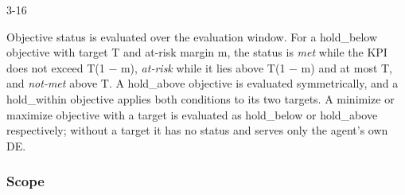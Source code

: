 \begin{wptable}{3-16}
\end{wptable}

Objective status is evaluated over the evaluation window. For a
hold\_\allowbreak{}below objective with target T and at-risk margin m,
the status is \emph{met} while the KPI does not exceed T(1 − m),
\emph{at-risk} while it lies above T(1 − m) and at most T, and
\emph{not-met} above T. A hold\_\allowbreak{}above objective is
evaluated symmetrically, and a hold\_\allowbreak{}within objective
applies both conditions to its two targets. A minimize or maximize
objective with a target is evaluated as hold\_\allowbreak{}below or
hold\_\allowbreak{}above respectively; without a target it has no status
and serves only the agent's own DE.

\hypertarget{scope}{%
\subsubsection{Scope}\label{scope}}

